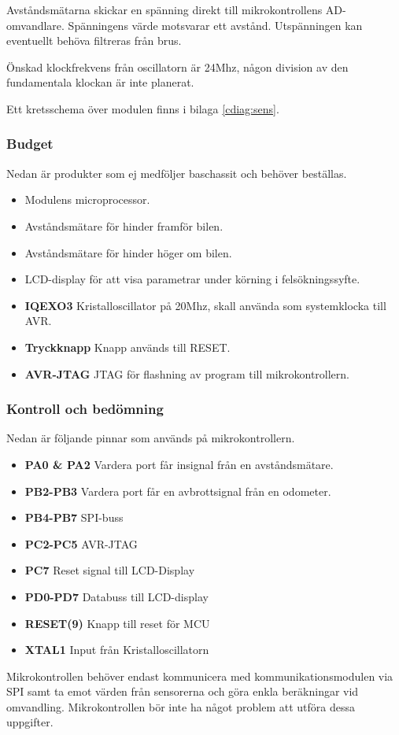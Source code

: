 \documentclass[designspec/spec.tex]{subfiles}
\begin{document}
Avståndsmätarna skickar en spänning direkt till mikrokontrollens AD-omvandlare.
Spänningens värde motsvarar ett avstånd. Utspänningen kan eventuellt behöva
filtreras från brus.

Önskad klockfrekvens från oscillatorn är 24Mhz, någon division av den
fundamentala klockan är inte planerat.

Ett kretsschema över modulen finns i bilaga \ref{cdiag:sens}.

\subsubsection{Budget}
Nedan är produkter som ej medföljer baschassit och behöver beställas.
\begin{itemize}
	\item \textbf{\modMicrocontroller} Modulens microprocessor. 
    \item \textbf{\modDistf} Avståndsmätare för hinder framför bilen.
    \item \textbf{\modDists} Avståndsmätare för hinder höger om bilen.
    \item \textbf{\modLcd} LCD-display för att visa parametrar under körning
    i felsökningssyfte.
    \item \textbf{IQEXO3} Kristalloscillator på 20Mhz, skall använda som systemklocka till AVR.
    \item \textbf{Tryckknapp} Knapp används till RESET.
    \item \textbf{AVR-JTAG} JTAG för flashning av program till mikrokontrollern.
\end{itemize}

\subsubsection{Kontroll och bedömning}
Nedan är följande pinnar som används på mikrokontrollern.
\begin{itemize}
   \item \textbf{PA0 \& PA2} Vardera port får insignal från en avståndsmätare.
   \item \textbf{PB2-PB3} Vardera port får en avbrottsignal från en odometer.
   \item \textbf{PB4-PB7} SPI-buss
   \item \textbf{PC2-PC5} AVR-JTAG
   \item \textbf{PC7} Reset signal till LCD-Display
   \item \textbf{PD0-PD7} Databuss till LCD-display
   \item \textbf{RESET(9)} Knapp till reset för MCU
   \item \textbf{XTAL1} Input från Kristalloscillatorn
\end{itemize}
Mikrokontrollen behöver endast kommunicera med kommunikationsmodulen via SPI
samt ta emot värden från sensorerna och göra enkla beräkningar vid omvandling.
Mikrokontrollen bör inte ha något problem att utföra dessa uppgifter.
\end{document}
